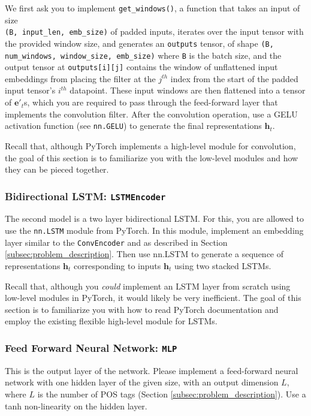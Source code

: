 \documentclass[11pt,addpoints,answers]{exam}
\newcommand{\ev}{\mathbf{e}}
\newcommand{\hv}{\mathbf{h}}
\begin{document}
We first ask you to implement \lstinline{get_windows()}, a function that takes an input of size\\ \lstinline{(B, input_len, emb_size)} of padded inputs, iterates over the input tensor with the provided window size, and generates an \lstinline{outputs} tensor, of shape \lstinline{(B, num_windows, window_size, emb_size)} where \lstinline{B} is the batch size, and the output tensor at \lstinline{outputs[i][j]} contains the window of unflattened input embeddings from placing the filter at the $j^{th}$ index from the start of the padded input tensor's $i^{th}$ datapoint. These input windows are then flattened into a tensor of $\ev'_t$s, which you are required to pass through the feed-forward layer that implements the convolution filter. After the convolution operation, use a GELU activation function (see \lstinline{nn.GELU}) to generate the final representations $\hv_t$.

\begin{notebox}
Recall that, although PyTorch implements a high-level module for convolution, the goal of this section is to familiarize you with the low-level modules and how they can be pieced together.
\end{notebox}

\subsubsection{Bidirectional LSTM: \lstinline{LSTMEncoder}}
The second model is a two layer bidirectional LSTM. For this, you are allowed to use the \lstinline{nn.LSTM} module from PyTorch. In this module, implement an embedding layer similar to the \lstinline{ConvEncoder} and as described in Section \ref{subsec:problem_description}. Then use nn.LSTM to generate a sequence of representations $\hv_t$ corresponding to inputs $\hv_t$ using two stacked LSTMs. 

\begin{notebox}
Recall that, although you \textit{could} implement an LSTM layer from scratch using low-level modules in PyTorch, it would likely be very inefficient. The goal of this section is to familiarize you with how to read PyTorch documentation and employ the existing flexible high-level module for LSTMs.
\end{notebox}

\subsubsection{Feed Forward Neural Network: \lstinline{MLP}}
This is the output layer of the network. Please implement a feed-forward neural network with one hidden layer of the given size, with an output dimension $L$, where $L$ is the number of POS tags (Section \ref{subsec:problem_description}). Use a tanh non-linearity on the hidden layer.
\end{document}
